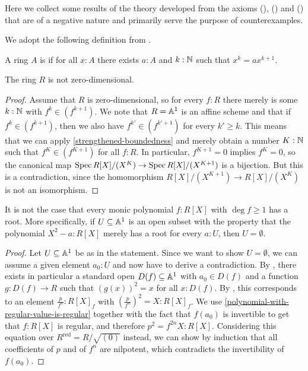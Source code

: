 Here we collect some results of
the theory developed from the axioms
(), () and ()
that are of a negative nature
and primarily serve the purpose of counterexamples.

We adopt the following definition from
\cite[Section IV.8]{lombardi-quitte}.

\begin{definition}%
  \label{zero-dimensional-ring}
  A ring $A$ is 
  if for all $x : A$
  there exists $a : A$ and $k : \mathbb{N}$
  such that $x^k = a x^{k + 1}$.
\end{definition}

\begin{lemma}%
  \label{R-not-zero-dimensional}
  The ring $R$ is not zero-dimensional.
\end{lemma}

\begin{proof}
  Assume that $R$ is zero-dimensional,
  so for every $f : R$ there merely is some $k : \mathbb{N}$ with $f^k \in (f^{k + 1})$.
  We note that $R = \mathbb{A}^1$ is an affine scheme and
  that if $f^k \in (f^{k + 1})$,
  then we also have $f^{k'} \in (f^{k' + 1})$ for every $k' \geq k$.
  This means that we can apply \cref{strengthened-boundedness}
  and merely obtain a number $K : \mathbb{N}$
  such that $f^K \in (f^{K + 1})$ for all $f : R$.
  In particular, $f^{K + 1} = 0$ implies $f^K = 0$,
  so the canonical map
  $\operatorname{Spec} R[X]/(X^K) \to \operatorname{Spec} R[X]/(X^{K + 1})$
  is a bijection.
  But this is a contradiction,
  since the homomorphism $R[X]/(X^{K + 1}) \to R[X]/(X^K)$
  is not an isomorphism.
\end{proof}

\begin{example}%
  \label{non-existence-of-roots}
  It is not the case that
  every monic polynomial $f : R[X]$ with $\deg f \geq 1$ has a root.
  More specifically,
  if $U \subseteq \mathbb{A}^1$ is an open subset
  with the property that
  the polynomial $X^2 - a : R[X]$ merely has a root
  for every $a : U$,
  then $U = \emptyset$.
\end{example}

\begin{proof}
  Let $U \subseteq \mathbb{A}^1$ be as in the statement.
  Since we want to show $U = \emptyset$,
  we can assume a given element $a_0 : U$
  and now have to derive a contradiction.
  By ,
  there exists in particular a standard open $D(f) \subseteq \mathbb{A}^1$
  with $a_0 \in D(f)$
  and a function $g : D(f) \to R$
  such that ${(g(x))}^2 = x$ for all $x : D(f)$.
  By ,
  this corresponds to an element $\frac{p}{f^n} : R[X]_f$
  with ${(\frac{p}{f^n})}^2 = X : R[X]_f$.
  We use \cref{polynomial-with-regular-value-is-regular}
  together with the fact that $f(a_0)$ is invertible
  to get that $f : R[X]$ is regular,
  and therefore $p^2 = f^{2n}X : R[X]$.
  Considering this equation over $R^{\mathrm{red}} = R/\sqrt{(0)}$ instead,
  we can show by induction that all coefficients of $p$ and of $f^n$ are nilpotent,
  which contradicts the invertibility of $f(a_0)$.
\end{proof}

